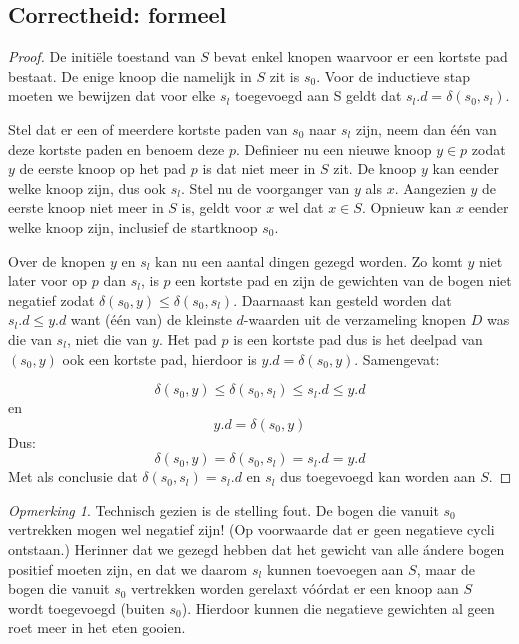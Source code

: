 \documentclass[conference]{IEEEtran}
\theoremstyle{definition}
\theoremstyle{remark}
\newtheorem*{remark}{Opmerking}
\begin{document}
\subsection{Correctheid: formeel}
\begin{proof}
De initiële toestand van $S$ bevat enkel knopen waarvoor er een kortste pad bestaat. De enige knoop die namelijk in $S$ zit is $s_0$. Voor de inductieve stap moeten we bewijzen dat voor elke $s_l$ toegevoegd aan S geldt dat $s_l.d = \delta(s_0, s_l)$.

Stel dat er een of meerdere kortste paden van $s_0$ naar $s_l$ zijn, neem dan één van deze kortste paden en benoem deze $p$. Definieer nu een nieuwe knoop $y \in p$ zodat $y$ de eerste knoop op het pad $p$ is dat niet meer in $S$ zit. De knoop $y$ kan eender welke knoop zijn, dus ook $s_l$. Stel nu de voorganger van $y$ als $x$. Aangezien $y$ de eerste knoop niet meer in $S$ is, geldt voor $x$ wel dat $x \in S$. Opnieuw kan $x$ eender welke knoop zijn, inclusief de startknoop $s_0$.

Over de knopen $y$ en $s_l$ kan nu een aantal dingen gezegd worden. Zo komt $y$ niet later voor op $p$ dan $s_l$, is $p$ een kortste pad en zijn de gewichten van de bogen niet negatief zodat $\delta(s_0, y) \leq \delta(s_0, s_l)$. Daarnaast kan gesteld worden dat $s_l.d \leq y.d$ want (één van) de kleinste $d$-waarden uit de verzameling knopen $D$ was die van $s_l$, niet die van $y$. Het pad $p$ is een kortste pad dus is het deelpad van $(s_0, y)$ ook een kortste pad, hierdoor is $y.d = \delta(s_0, y)$. Samengevat:

\[\delta(s_0, y) \leq \delta(s_0, s_l) \leq s_l.d \leq y.d\]
en
\[y.d = \delta(s_0, y)\]
Dus:
\[\delta(s_0, y) = \delta(s_0, s_l) = s_l.d = y.d\]
Met als conclusie dat $\delta(s_0, s_l) = s_l.d$ en $s_l$ dus toegevoegd kan worden aan $S$.
\end{proof}

\begin{remark}
    Technisch gezien is de stelling  fout. De bogen die vanuit $s_0$ vertrekken mogen wel negatief zijn! (Op voorwaarde dat er geen negatieve cycli ontstaan.) Herinner dat we gezegd hebben dat het gewicht van alle ándere bogen positief moeten zijn, en dat we daarom $s_l$ kunnen toevoegen aan $S$, maar de bogen die vanuit $s_0$ vertrekken worden gerelaxt vóórdat er een knoop aan $S$ wordt toegevoegd (buiten $s_0$). Hierdoor kunnen die negatieve gewichten al geen roet meer in het eten gooien.
\end{remark}
\end{document}
